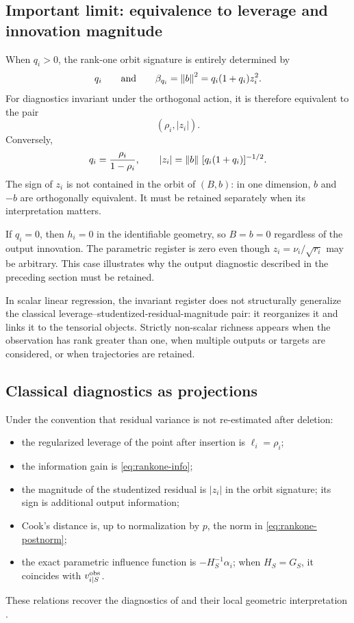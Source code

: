 \subsection{Important limit: equivalence to leverage and innovation magnitude}
When $q_i>0$, the rank-one orbit signature is entirely determined by
\begin{equation}
q_i
\qquad\text{and}\qquad
\beta_{q_i}=\left\lVert b\right\rVert^2=q_i(1+q_i)z_i^2.
\end{equation}
For diagnostics invariant under the orthogonal action, it is therefore equivalent to the pair
\begin{equation}
\boxed{(\rho_i,|z_i|).}
\label{eq:rankone-complete-pair}
\end{equation}
Conversely,
\[
q_i=\frac{\rho_i}{1-\rho_i},
\qquad
|z_i|=\left\lVert b\right\rVert\,[q_i(1+q_i)]^{-1/2}.
\]
The sign of $z_i$ is not contained in the orbit of $(B,b)$: in one dimension, $b$ and $-b$ are orthogonally equivalent. It must be retained separately when its interpretation matters.

If $q_i=0$, then $h_i=0$ in the identifiable geometry, so $B=b=0$ regardless of the output innovation. The parametric register is zero even though $z_i=\nu_i/\sqrt{r_i}$ may be arbitrary. This case illustrates why the output diagnostic described in the preceding section must be retained.

\begin{ochrebox}
In scalar linear regression, the invariant register does not structurally generalize the classical leverage--studentized-residual-magnitude pair: it reorganizes it and links it to the tensorial objects. Strictly non-scalar richness appears when the observation has rank greater than one, when multiple outputs or targets are considered, or when trajectories are retained.
\end{ochrebox}

\subsection{Classical diagnostics as projections}
Under the convention that residual variance is not re-estimated after deletion:
\begin{itemize}
  \item the regularized leverage of the point after insertion is $\ell_i=\rho_i$;
  \item the information gain is \eqref{eq:rankone-info};
  \item the magnitude of the studentized residual is $|z_i|$ in the orbit signature; its sign is additional output information;
  \item Cook's distance is, up to normalization by $p$, the norm in \eqref{eq:rankone-postnorm};
  \item the exact parametric influence function is $-H_S^{-1}\alpha_i$; when $H_S=G_S$, it coincides with $v_{i\mid S}^{\rm obs}$.
\end{itemize}
These relations recover the diagnostics of \citet{cook1977,hampel1974} and their local geometric interpretation \citep{cook1986,stlaurent1993}.

